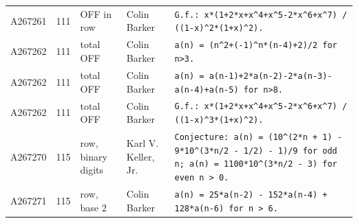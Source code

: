\documentclass[11pt]{article}
\theoremstyle{definition}
\theoremstyle{remark}
\begin{document}
{\begin{longtable}{p{1.3cm}p{0.7cm}p{2.4cm}p{2.3cm}p{7.3cm}}
A267261 & 111 & OFF in row & Colin Barker & \texttt{G.f.: \allowbreak{}x*\allowbreak{}(1+\allowbreak{}2*\allowbreak{}x+\allowbreak{}x\^{}4+\allowbreak{}x\^{}5-\allowbreak{}2*\allowbreak{}x\^{}6+\allowbreak{}x\^{}7)\allowbreak{} \allowbreak{}/\allowbreak{} \allowbreak{}((1-\allowbreak{}x)\allowbreak{}\^{}2*\allowbreak{}(1+\allowbreak{}x)\allowbreak{}\^{}2)\allowbreak{}.} \\
A267262 & 111 & total OFF & Colin Barker & \texttt{a(n)\allowbreak{} \allowbreak{}=\allowbreak{} \allowbreak{}(n\^{}2+\allowbreak{}(-\allowbreak{}1)\allowbreak{}\^{}n*\allowbreak{}(n-\allowbreak{}4)\allowbreak{}+\allowbreak{}2)\allowbreak{}/\allowbreak{}2 \allowbreak{}for \allowbreak{}n>3.} \\
A267262 & 111 & total OFF & Colin Barker & \texttt{a(n)\allowbreak{} \allowbreak{}=\allowbreak{} \allowbreak{}a(n-\allowbreak{}1)\allowbreak{}+\allowbreak{}2*\allowbreak{}a(n-\allowbreak{}2)\allowbreak{}-\allowbreak{}2*\allowbreak{}a(n-\allowbreak{}3)\allowbreak{}-\allowbreak{}a(n-\allowbreak{}4)\allowbreak{}+\allowbreak{}a(n-\allowbreak{}5)\allowbreak{} \allowbreak{}for \allowbreak{}n>8.} \\
A267262 & 111 & total OFF & Colin Barker & \texttt{G.f.: \allowbreak{}x*\allowbreak{}(1+\allowbreak{}2*\allowbreak{}x+\allowbreak{}x\^{}4+\allowbreak{}x\^{}5-\allowbreak{}2*\allowbreak{}x\^{}6+\allowbreak{}x\^{}7)\allowbreak{} \allowbreak{}/\allowbreak{} \allowbreak{}((1-\allowbreak{}x)\allowbreak{}\^{}3*\allowbreak{}(1+\allowbreak{}x)\allowbreak{}\^{}2)\allowbreak{}.} \\
A267270 & 115 & row, binary digits & Karl V. Keller, Jr. & \texttt{Conjecture: \allowbreak{}a(n)\allowbreak{} \allowbreak{}=\allowbreak{} \allowbreak{}(10\^{}(2*\allowbreak{}n \allowbreak{}+\allowbreak{} \allowbreak{}1)\allowbreak{} \allowbreak{}-\allowbreak{} \allowbreak{}9*\allowbreak{}10\^{}(3*\allowbreak{}n/\allowbreak{}2 \allowbreak{}-\allowbreak{} \allowbreak{}1/\allowbreak{}2)\allowbreak{} \allowbreak{}-\allowbreak{} \allowbreak{}1)\allowbreak{}/\allowbreak{}9 \allowbreak{}for \allowbreak{}odd \allowbreak{}n; \allowbreak{}a(n)\allowbreak{} \allowbreak{}=\allowbreak{} \allowbreak{}1100*\allowbreak{}10\^{}(3*\allowbreak{}n/\allowbreak{}2 \allowbreak{}-\allowbreak{} \allowbreak{}3)\allowbreak{} \allowbreak{}for \allowbreak{}even \allowbreak{}n \allowbreak{}> \allowbreak{}0.} \\
A267271 & 115 & row, base 2 & Colin Barker & \texttt{a(n)\allowbreak{} \allowbreak{}=\allowbreak{} \allowbreak{}25*\allowbreak{}a(n-\allowbreak{}2)\allowbreak{} \allowbreak{}-\allowbreak{} \allowbreak{}152*\allowbreak{}a(n-\allowbreak{}4)\allowbreak{} \allowbreak{}+\allowbreak{} \allowbreak{}128*\allowbreak{}a(n-\allowbreak{}6)\allowbreak{} \allowbreak{}for \allowbreak{}n \allowbreak{}> \allowbreak{}6.} \\

\end{longtable}}
\end{document}

